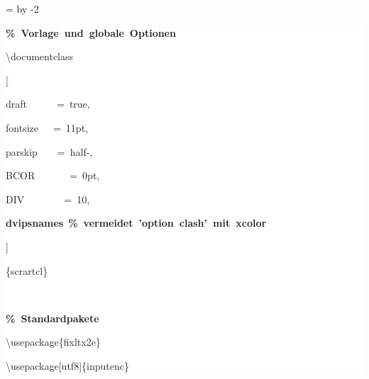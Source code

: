 \begingroup
\ttfamily
{}
=\textwidth
\advance{} by -2\fboxsep
\noindent
\colorbox{background}
{%
\parbox{\dimen255}
{%
\rule[-0.5ex]{0pt}{2.5ex}\hspace*{0.0em}\textcolor{G}{\textbf{\%~Vorlage~und~globale~Optionen}}\\
\rule[-0.5ex]{0pt}{2.5ex}\hspace*{0.0em}\textbackslash{}documentclass\\
\rule[-0.5ex]{0pt}{2.5ex}\hspace*{0.0em}[\\
\rule[-0.5ex]{0pt}{2.5ex}\hspace*{1.0em}draft~~~~~~=~true,\\
\rule[-0.5ex]{0pt}{2.5ex}\hspace*{1.0em}fontsize~~~=~11pt,\\
\rule[-0.5ex]{0pt}{2.5ex}\hspace*{1.0em}parskip~~~~=~half{-},\\
\rule[-0.5ex]{0pt}{2.5ex}\hspace*{1.0em}BCOR~~~~~~~=~0pt,\\
\rule[-0.5ex]{0pt}{2.5ex}\hspace*{1.0em}DIV~~~~~~~~=~10,\\
\rule[-0.5ex]{0pt}{2.5ex}\hspace*{1.0em}\textcolor{R}{\textbf{dvipsnames}}~\textcolor{G}{\textbf{\%~vermeidet~'option~clash'~mit~xcolor}}\\
\rule[-0.5ex]{0pt}{2.5ex}\hspace*{0.0em}]\\
\rule[-0.5ex]{0pt}{2.5ex}\hspace*{0.0em}\{scrartcl\}\\
\rule[-0.5ex]{0pt}{2.5ex}\hspace*{0.0em}\\
\rule[-0.5ex]{0pt}{2.5ex}\hspace*{0.0em}\textcolor{G}{\textbf{\%~Standardpakete}}\\
\rule[-0.5ex]{0pt}{2.5ex}\hspace*{0.0em}\textbackslash{}usepackage\{fixltx2e\}\\
\rule[-0.5ex]{0pt}{2.5ex}\hspace*{0.0em}\textbackslash{}usepackage[utf8]\{inputenc\}\\
}}
